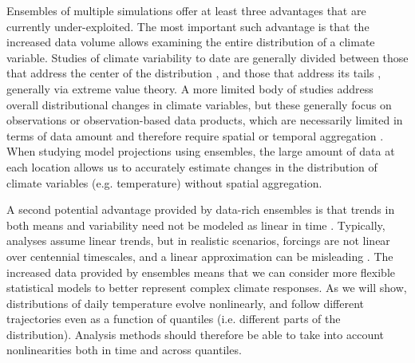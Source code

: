 \documentclass{ametsoc}
\begin{document}
Ensembles of multiple simulations offer at least three advantages that are currently under-exploited. The most important such advantage is that the increased data volume allows examining the entire distribution of a climate variable.
 Studies of climate variability to date are generally divided between those that address the center of the distribution 
\citep[e.g.][]{semenov2002secular,raisanen2002co2, kitoh2009changes, screen2014arctic, schneider2015physics}, and those that address its tails \citep[e.g.][]{katz1992extreme, meehl2009relative, northrop2011threshold, davison2012statistical, huser2014space, trenberth2015attribution, huang2015estimating, jalbert2017spatiotemporal}, generally via extreme value theory. %
A more limited body of studies address overall distributional changes in climate variables, but these generally focus on observations or observation-based data products, which are necessarily limited in terms of data amount and therefore require spatial or temporal aggregation \citep{donat2012shifting, stainforth2013mapping, chapman2013estimating, huybers2014us, mckinnon2016changing, rhines2017seasonally}. 
When studying model projections using ensembles, the large amount of data at each location allows us to accurately estimate changes in the distribution of climate variables (e.g. temperature) without spatial aggregation.

A second potential advantage provided by data-rich ensembles is that trends in both means and variability need not be modeled as linear in time \citep{franzke2015local,gao2017quantile}. Typically, analyses assume linear trends,  
but in realistic scenarios, forcings are not linear over centennial timescales, and a linear approximation can be misleading \citep[see for example][]{poppick2017estimating}. The increased data provided by ensembles means that we can consider more flexible statistical models to better represent complex climate responses. %
As we will show, distributions of daily temperature evolve nonlinearly, and follow different trajectories even as a function of quantiles (i.e. different parts of the distribution). %
Analysis methods should therefore be able to take into account nonlinearities both in time and across quantiles. 
\end{document}
